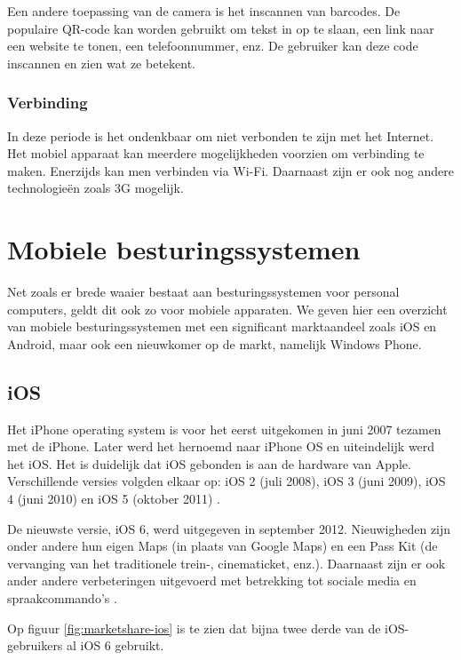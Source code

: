 Een andere toepassing van de camera is het inscannen van barcodes. De populaire QR-code kan worden gebruikt om tekst in op te slaan, een link naar een website te tonen, een telefoonnummer, enz. De gebruiker kan deze code inscannen en zien wat ze betekent.

\subsubsection{Verbinding}
In deze periode is het ondenkbaar om niet verbonden te zijn met het Internet. Het mobiel apparaat kan meerdere mogelijkheden voorzien om verbinding te maken. Enerzijds kan men verbinden via Wi-Fi. Daarnaast zijn er ook nog andere technologieën zoals 3G mogelijk.


\section{Mobiele besturingssystemen}
\label{sec:mobiele-besturingssystemen}
Net zoals er brede waaier bestaat aan besturingssystemen voor personal computers, geldt dit ook zo voor mobiele apparaten. We geven hier een overzicht van mobiele besturingssystemen met een significant marktaandeel \cite{David2011, Hales2012} zoals iOS en Android, maar ook een nieuwkomer op de markt, namelijk Windows Phone.

\subsection{iOS}
Het iPhone operating system is voor het eerst uitgekomen in juni 2007 tezamen met de iPhone. Later werd het hernoemd naar iPhone OS en uiteindelijk werd het iOS. Het is duidelijk dat iOS gebonden is aan de hardware van Apple. Verschillende versies volgden elkaar op: iOS 2 (juli 2008), iOS 3 (juni 2009), iOS 4 (juni 2010) en iOS 5 (oktober 2011) \cite{Deitel2012, PhilDutson2012}. 

De nieuwste versie, iOS 6, werd uitgegeven in september 2012. Nieuwigheden zijn onder andere hun eigen Maps (in plaats van Google Maps) en een Pass Kit (de vervanging van het traditionele trein-, cinematicket, enz.). Daarnaast zijn er ook ander andere verbeteringen uitgevoerd met betrekking tot sociale media en spraakcommando's \cite{Deitel2012}.

Op figuur \ref{fig:marketshare-ios} is te zien dat bijna twee derde van de iOS-gebruikers al iOS 6 gebruikt.

